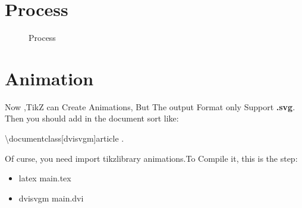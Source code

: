 \documentclass{article}
\begin{document}
\section{Process}
\begin{figure}[!htb]
    \centering
    \caption{Process}
    \label{Process}
\end{figure}


\section{Animation}
\qquad Now ,TikZ can Create Animations, But The output Format only Support
{\bf .svg}. Then you should add {\ttfamily [dvisvgm]} in the document
sort like:

{\textbackslash \ttfamily documentclass[dvisvgm]{article}} .

Of curse, you need import tikzlibrary {\ttfamily animations}.To Compile it,
this is the step:
\begin{itemize}
    \item latex main.tex
    \item dvisvgm main.dvi
\end{itemize} 
\end{document}
